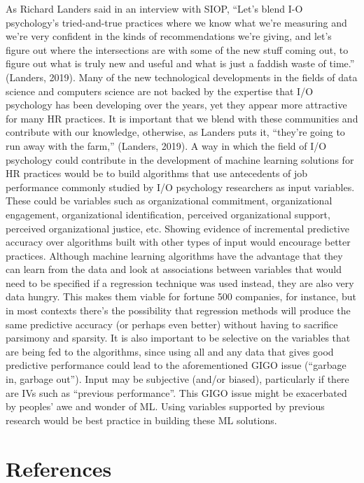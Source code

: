 \documentclass[
  man]{apa7}
\begin{document}
As Richard Landers said in an interview with SIOP, ``Let's blend I-O psychology's tried-and-true practices where we know what we're measuring and we're very confident in the kinds of recommendations we're giving, and let's figure out where the intersections are with some of the new stuff coming out, to figure out what is truly new and useful and what is just a faddish waste of time.'' (Landers, 2019).
Many of the new technological developments in the fields of data science and computers science are not backed by the expertise that I/O psychology has been developing over the years, yet they appear more attractive for many HR practices.
It is important that we blend with these communities and contribute with our knowledge, otherwise, as Landers puts it, ``they're going to run away with the farm,'' (Landers, 2019).
A way in which the field of I/O psychology could contribute in the development of machine learning solutions for HR practices would be to build algorithms that use antecedents of job performance commonly studied by I/O psychology researchers as input variables.
These could be variables such as organizational commitment, organizational engagement, organizational identification, perceived organizational support, perceived organizational justice, etc.
Showing evidence of incremental predictive accuracy over algorithms built with other types of input would encourage better practices.
Although machine learning algorithms have the advantage that they can learn from the data and look at associations between variables that would need to be specified if a regression technique was used instead, they are also very data hungry.
This makes them viable for fortune 500 companies, for instance, but in most contexts there's the possibility that regression methods will produce the same predictive accuracy (or perhaps even better) without having to sacrifice parsimony and sparsity.
It is also important to be selective on the variables that are being fed to the algorithms, since using all and any data that gives good predictive performance could lead to the aforementioned GIGO issue (``garbage in, garbage out'').
Input may be subjective (and/or biased), particularly if there are IVs such as ``previous performance''.
This GIGO issue might be exacerbated by peoples' awe and wonder of ML.
Using variables supported by previous research would be best practice in building these ML solutions.

\newpage

\hypertarget{references}{%
\section{References}\label{references}}
\end{document}
